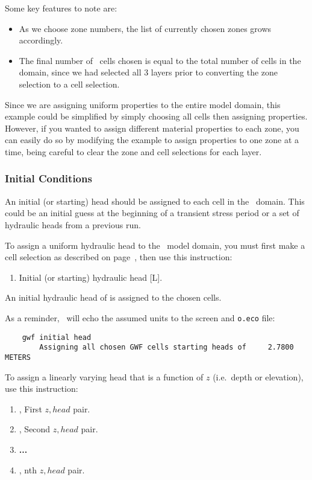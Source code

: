 {Some key features to note are:
\begin{itemize}
    \item As we choose zone numbers, the list of currently chosen zones grows accordingly.
    \item The final number of \gwf\ cells chosen is equal to the total number of cells in the domain, since we had selected all 3 layers prior to converting the  zone selection to a cell selection.
\end{itemize}
Since we are assigning uniform properties to the entire model domain, this example could be simplified by simply choosing all cells then assigning properties.  However, if you wanted to assign different material properties to each zone, you can easily do so by modifying the example to assign properties to one zone at a time, being careful to clear the zone and cell selections for each layer.

\subsubsection{Initial Conditions}  
An initial (or starting) head should be assigned to each cell in the \gwf\ domain.  This could be an initial guess at the beginning of a transient stress period or a set of hydraulic heads from a previous run.

To assign a uniform hydraulic head to the \gwf\ model domain, you must first make a cell selection as described on page~\pageref{page:cellSelect}, then use this instruction:

    {
        \squish
        \begin{enumerate}
        \item {}  Initial (or starting) hydraulic head [L].
        \end{enumerate}
          An initial hydraulic head  of  is assigned to the chosen cells.
    }

As a reminder, \mut\ will echo the assumed units to the screen and \texttt{o.eco} file:
\begin{verbatim}
    gwf initial head
    	Assigning all chosen GWF cells starting heads of     2.7800         METERS

\end{verbatim}


To assign a linearly varying head that is a function of $z$ (i.e.\ depth or elevation), use this instruction:
    {
    \squish
    \begin{enumerate}
    \item {},   First $z, head$ pair.
    \item {},   Second $z, head$ pair.
    \item \textbf{...}
    \item {},   nth $z, head$  pair.
    \end{enumerate}

}}
